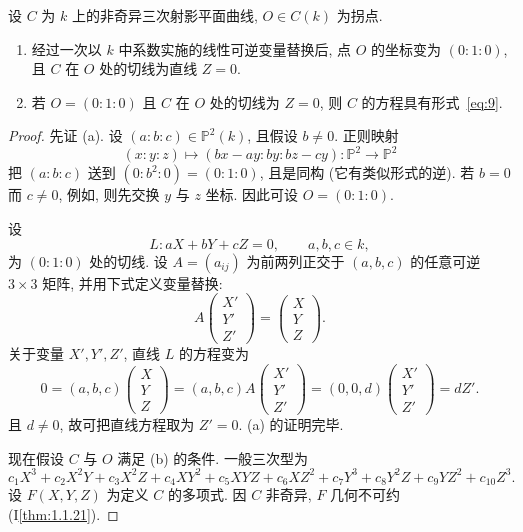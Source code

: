 \begin{proposition} \label{thm:2.1.2} 
设 $C$ 为 $k$ 上的非奇异三次射影平面曲线, $O\in C(k)$ 为拐点.
\begin{enumerate}[label=\textup{(\alph*)}]
\item 经过一次以 $k$ 中系数实施的线性可逆变量替换后, 点 $O$ 的坐标变为 $(0:1:0)$, 且 $C$ 在 $O$ 处的切线为直线 $Z = 0$.
\item 若 $O = (0:1:0)$ 且 $C$ 在 $O$ 处的切线为 $Z = 0$, 则 $C$ 的方程具有形式~\eqref{eq:9}.
\end{enumerate}
\end{proposition}

\begin{proof}
先证 (a). 设 $(a:b:c)\in\mathbb{P}^2(k)$, 且假设 $b\neq 0$. 正则映射
\[
(x:y:z)\mapsto(bx-ay:by:bz-cy)\colon\mathbb{P}^2\to\mathbb{P}^2
\]
把 $(a:b:c)$ 送到 $(0:b^2:0) = (0:1:0)$, 且是同构 (它有类似形式的逆). 若 $b = 0$ 而 $c\neq 0$, 例如, 则先交换 $y$ 与 $z$ 坐标. 因此可设 $O = (0:1:0)$.

设
\[
L\colon aX + bY + cZ = 0, \qquad a,b,c\in k,
\]
为 $(0:1:0)$ 处的切线. 设 $A = (a_{ij})$ 为前两列正交于 $(a,b,c)$ 的任意可逆 $3\times 3$ 矩阵, 并用下式定义变量替换:
\[
A\begin{pmatrix}X'\\ Y'\\ Z'\end{pmatrix} = \begin{pmatrix}X\\ Y\\ Z\end{pmatrix}.
\]
关于变量 $X', Y', Z'$, 直线 $L$ 的方程变为
\[
0 = (a,b,c)\begin{pmatrix}X\\ Y\\ Z\end{pmatrix} = (a,b,c)A\begin{pmatrix}X'\\ Y'\\ Z'\end{pmatrix} = (0,0,d)\begin{pmatrix}X'\\ Y'\\ Z'\end{pmatrix} = dZ'.
\]
且 $d\neq 0$, 故可把直线方程取为 $Z' = 0$. (a) 的证明完毕.

现在假设 $C$ 与 $O$ 满足 (b) 的条件. 一般三次型为
\[
c_1X^3 + c_2X^2Y + c_3X^2Z + c_4XY^2 + c_5XYZ + c_6XZ^2 + c_7Y^3 + c_8Y^2Z + c_9YZ^2 + c_{10}Z^3.
\]
设 $F(X,Y,Z)$ 为定义 $C$ 的多项式. 因 $C$ 非奇异, $F$ 几何不可约 (I\ref{thm:1.1.21}).


\end{proof}
